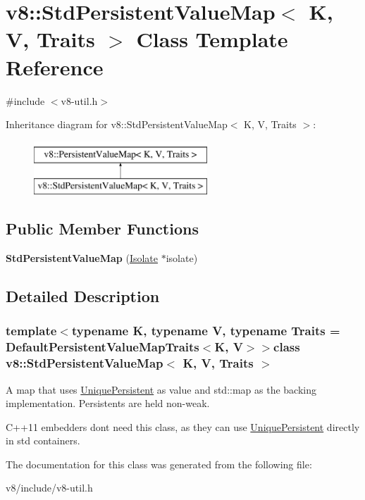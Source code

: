 \hypertarget{classv8_1_1StdPersistentValueMap}{}\section{v8\+:\+:Std\+Persistent\+Value\+Map$<$ K, V, Traits $>$ Class Template Reference}
\label{classv8_1_1StdPersistentValueMap}


{\ttfamily \#include $<$v8-\/util.\+h$>$}

Inheritance diagram for v8\+:\+:Std\+Persistent\+Value\+Map$<$ K, V, Traits $>$\+:\begin{figure}[H]
\begin{center}
\leavevmode
\includegraphics[height=2.000000cm]{classv8_1_1StdPersistentValueMap}
\end{center}
\end{figure}
\subsection*{Public Member Functions}
\begin{DoxyCompactItemize}
\item 
\hypertarget{classv8_1_1StdPersistentValueMap_a44d7222a863267780db07c882056f73b}{}{\bfseries Std\+Persistent\+Value\+Map} (\hyperlink{classv8_1_1Isolate}{Isolate} $\ast$isolate)\label{classv8_1_1StdPersistentValueMap_a44d7222a863267780db07c882056f73b}

\end{DoxyCompactItemize}


\subsection{Detailed Description}
\subsubsection*{template$<$typename K, typename V, typename Traits = Default\+Persistent\+Value\+Map\+Traits$<$\+K, V$>$$>$class v8\+::\+Std\+Persistent\+Value\+Map$<$ K, V, Traits $>$}

A map that uses \hyperlink{classv8_1_1UniquePersistent}{Unique\+Persistent} as value and std\+::map as the backing implementation. Persistents are held non-\/weak.

C++11 embedders don\textquotesingle{}t need this class, as they can use \hyperlink{classv8_1_1UniquePersistent}{Unique\+Persistent} directly in std containers. 

The documentation for this class was generated from the following file\+:\begin{DoxyCompactItemize}
\item 
v8/include/v8-\/util.\+h\end{DoxyCompactItemize}
